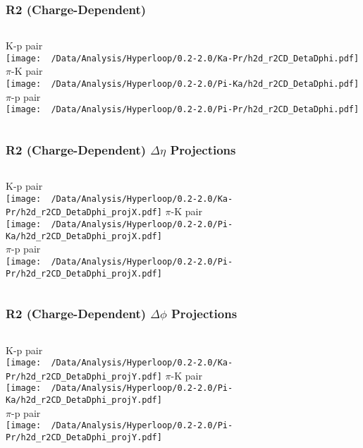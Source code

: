 \documentclass{beamer}
\begin{document}
\begin{frame}
	\frametitle{R2 (Charge-Dependent)}
	\begin{columns}
		\centering
		K-p pair\\
		\texttt{[image: ~/Data/Analysis/Hyperloop/0.2-2.0/Ka-Pr/h2d\_r2CD\_DetaDphi.pdf]}
		\centering
		$\pi$-K pair\\
		\texttt{[image: ~/Data/Analysis/Hyperloop/0.2-2.0/Pi-Ka/h2d\_r2CD\_DetaDphi.pdf]}\\$\pi$-p pair\\
		\texttt{[image: ~/Data/Analysis/Hyperloop/0.2-2.0/Pi-Pr/h2d\_r2CD\_DetaDphi.pdf]}
	\end{columns}
\end{frame}
\begin{frame}
	\frametitle{R2 (Charge-Dependent) $\Delta\eta$ Projections}
	\begin{columns}
		\column{0.5\textwidth}
		\centering
		K-p pair\\
		\texttt{[image: ~/Data/Analysis/Hyperloop/0.2-2.0/Ka-Pr/h2d\_r2CD\_DetaDphi\_projX.pdf]}
		\column{0.5\textwidth}
		\centering
		$\pi$-K pair\\
		\texttt{[image: ~/Data/Analysis/Hyperloop/0.2-2.0/Pi-Ka/h2d\_r2CD\_DetaDphi\_projX.pdf]}\\$\pi$-p pair\\
		\texttt{[image: ~/Data/Analysis/Hyperloop/0.2-2.0/Pi-Pr/h2d\_r2CD\_DetaDphi\_projX.pdf]}
	\end{columns}
\end{frame}
\begin{frame}
	\frametitle{R2 (Charge-Dependent) $\Delta\phi$ Projections}
	\begin{columns}
		\centering
		K-p pair\\
		\texttt{[image: ~/Data/Analysis/Hyperloop/0.2-2.0/Ka-Pr/h2d\_r2CD\_DetaDphi\_projY.pdf]}
		\centering
		$\pi$-K pair\\
		\texttt{[image: ~/Data/Analysis/Hyperloop/0.2-2.0/Pi-Ka/h2d\_r2CD\_DetaDphi\_projY.pdf]}\\$\pi$-p pair\\
		\texttt{[image: ~/Data/Analysis/Hyperloop/0.2-2.0/Pi-Pr/h2d\_r2CD\_DetaDphi\_projY.pdf]}
	\end{columns}
\end{frame}
\end{document}
